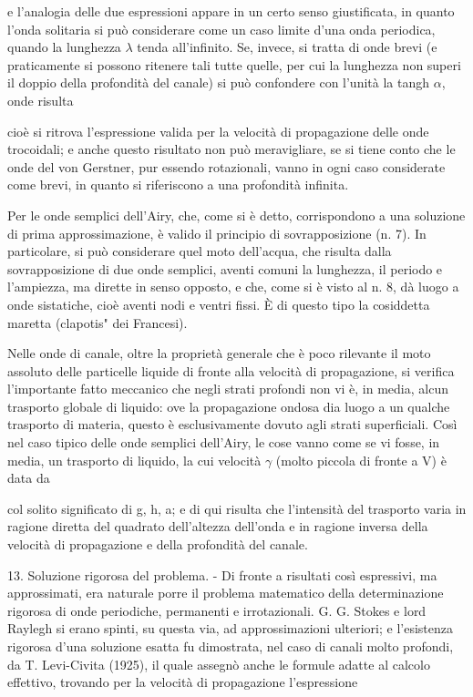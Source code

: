 \documentclass[a4paper]{article}
\begin{document}
e l'analogia delle due espressioni appare in un certo senso giustificata, in quanto l'onda solitaria si può considerare come un caso limite d'una onda periodica, quando la lunghezza $\lambda$ tenda all'infinito. Se, invece, si tratta di onde brevi (e praticamente si possono ritenere tali tutte quelle, per cui la lunghezza non superi il doppio della profondità del canale) si può confondere con l'unità la tangh $\alpha$, onde risulta

cioè si ritrova l'espressione valida per la velocità di propagazione delle onde trocoidali; e anche questo risultato non può meravigliare, se si tiene conto che le onde del von Gerstner, pur essendo rotazionali, vanno in ogni caso considerate come brevi, in quanto si riferiscono a una profondità infinita.

Per le onde semplici dell'Airy, che, come si è detto, corrispondono a una soluzione di prima approssimazione, è valido il principio di sovrapposizione (n. 7). In particolare, si può considerare quel moto dell'acqua, che risulta dalla sovrapposizione di due onde semplici, aventi comuni la lunghezza, il periodo e l'ampiezza, ma dirette in senso opposto, e che, come si è visto al n. 8, dà luogo a onde sistatiche, cioè aventi nodi e ventri fissi. È di questo tipo la cosiddetta maretta (clapotis" dei Francesi).

Nelle onde di canale, oltre la proprietà generale che è poco rilevante il moto assoluto delle particelle liquide di fronte alla velocità di propagazione, si verifica l'importante fatto meccanico che negli strati profondi non vi è, in media, alcun trasporto globale di liquido: ove la propagazione ondosa dia luogo a un qualche trasporto di materia, questo è esclusivamente dovuto agli strati superficiali. Così nel caso tipico delle onde semplici dell'Airy, le cose vanno come se vi fosse, in media, un trasporto di liquido, la cui velocità $\gamma$ (molto piccola di fronte a V) è data da

col solito significato di g, h, a; e di qui risulta che l'intensità del trasporto varia in ragione diretta del quadrato dell'altezza dell'onda e in ragione inversa della velocità di propagazione e della profondità del canale.

13. Soluzione rigorosa del problema. - Di fronte a risultati così espressivi, ma approssimati, era naturale porre il problema matematico della determinazione rigorosa di onde periodiche, permanenti e irrotazionali. G. G. Stokes e lord Raylegh si erano spinti, su questa via, ad approssimazioni ulteriori; e l'esistenza rigorosa d'una soluzione esatta fu dimostrata, nel caso di canali molto profondi, da T. Levi-Civita (1925), il quale assegnò anche le formule adatte al calcolo effettivo, trovando per la velocità di propagazione l'espressione
\end{document}
